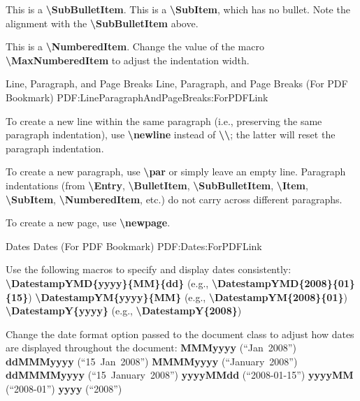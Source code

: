 \documentclass[letterpaper,MMMyyyy,nonstopmode]{simpleresumecv}
\newcommand{\Code}[1]{\mbox{\textbf{#1}}}
\newcommand{\CodeCommand}[1]{\mbox{\textbf{\textbackslash{#1}}}}
\begin{document}
\begin{Body}
\Gap
\SubBulletItem
This is a \CodeCommand{SubBulletItem}.
\SubItem
This is a \CodeCommand{SubItem}, which has no bullet.
Note the alignment with the \CodeCommand{SubBulletItem} above.

\Gap
\NumberedItem{[42]}
This is a \CodeCommand{NumberedItem}.
Change the value of the macro \CodeCommand{MaxNumberedItem} to adjust the indentation width.

\BigGap
\SubSection
{Line, Paragraph, and Page Breaks}
{Line, Paragraph, and Page Breaks (For PDF Bookmark)}
{PDF:LineParagraphAndPageBreaks:ForPDFLink}

\Gap
\BulletItem
To create a new line within the same paragraph (i.e., preserving the same paragraph indentation), use \CodeCommand{newline} instead of \CodeCommand{\textbackslash};
the latter will reset the paragraph indentation.

\Gap
\BulletItem
To create a new paragraph, use \CodeCommand{par} or simply leave an empty line.
Paragraph indentations (from
\CodeCommand{Entry},
\CodeCommand{BulletItem},
\CodeCommand{SubBulletItem},
\CodeCommand{Item},
\CodeCommand{SubItem},
\CodeCommand{NumberedItem},
etc.) do not carry across different paragraphs.

\Gap
\BulletItem
To create a new page, use \CodeCommand{newpage}.

\BigGap
\SubSection
{Dates}
{Dates (For PDF Bookmark)}
{PDF:Dates:ForPDFLink}

\Gap
\BulletItem
Use the following macros to specify and display dates consistently:
\SubBulletItem
\CodeCommand{DatestampYMD\{yyyy\}\{MM\}\{dd\}}
(e.g., \CodeCommand{DatestampYMD\{2008\}\{01\}\{15\}})
\SubBulletItem
\CodeCommand{DatestampYM\{yyyy\}\{MM\}}
(e.g., \CodeCommand{DatestampYM\{2008\}\{01\}})
\SubBulletItem
\CodeCommand{DatestampY\{yyyy\}}
(e.g., \CodeCommand{DatestampY\{2008\}})

\Gap
\BulletItem
Change the date format option passed to the document class to adjust how dates are displayed throughout the document:
\SubBulletItem
\Code{MMMyyyy} (``Jan~2008'')
\SubBulletItem
\Code{ddMMMyyyy} (``15~Jan~2008'')
\SubBulletItem
\Code{MMMMyyyy} (``January~2008'')
\SubBulletItem
\Code{ddMMMMyyyy} (``15~January~2008'')
\SubBulletItem
\Code{yyyyMMdd} (``2008-01-15'')
\SubBulletItem
\Code{yyyyMM} (``2008-01'')
\SubBulletItem
\Code{yyyy} (``2008'')

\endgroup

\fi

\end{Body}
\end{document}
